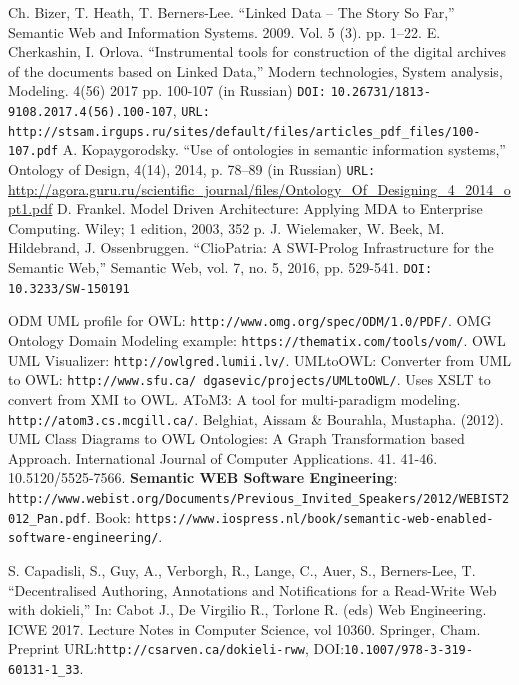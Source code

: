 \documentclass[conference,a4paper]{IEEEtran}
\providecommand\url[1]{\texttt{#1}}
\begin{document}
\begin{thebibliography}{11}

 Ch. Bizer, T. Heath, T. Berners-Lee. ``Linked Data – The Story So Far,'' Semantic Web and Information Systems. 2009. Vol. 5 (3). pp. 1–22.
 E. Cherkashin, I. Orlova. ``Instrumental tools for construction of the digital archives of the documents based on Linked Data,'' Modern technologies, System analysis, Modeling. 4(56) 2017 pp. 100-107 (in Russian) \texttt{DOI:} \url{10.26731/1813-9108.2017.4(56).100-107}, \texttt{URL:} \url{http://stsam.irgups.ru/sites/default/files/articles\_pdf\_files/100-107.pdf}
 A. Kopaygorodsky. ``Use of ontologies in semantic information systems,'' Ontology of Design, 4(14), 2014, p. 78--89 (in Russian) \texttt{URL:} \href{http://agora.guru.ru/scientific_journal/files/Ontology_Of_Designing_4_2014_opt1.pdf#page=79}{\ttfamily http://agora.guru.ru/scientific\_journal/files/On\-tology\_Of\_Designing\_4\_2014\_opt1.pdf}
 D. Frankel. Model Driven Architecture: Applying MDA to Enterprise Computing. Wiley; 1 edition, 2003, 352 p.
 J. Wielemaker, W. Beek, M. Hildebrand, J. Ossenbruggen. ``ClioPatria: A SWI-Prolog Infrastructure for the Semantic Web,'' Semantic Web, vol. 7, no. 5, 2016, pp. 529-541. \texttt{DOI:} \url{10.3233/SW-150191}

 ODM UML profile for OWL: \url{http://www.omg.org/spec/ODM/1.0/PDF/}.
 OMG Ontology Domain Modeling example: \url{https://thematix.com/tools/vom/}.
 OWL UML Visualizer: \url{http://owlgred.lumii.lv/}.
 UMLtoOWL: Converter from UML to OWL: \url{http://www.sfu.ca/~dgasevic/projects/UMLtoOWL/}. Uses XSLT to convert from XMI to OWL.
 AToM3: A tool for multi-paradigm modeling. \url{http://atom3.cs.mcgill.ca/}.
 Belghiat, Aissam \& Bourahla, Mustapha. (2012). UML Class Diagrams to OWL Ontologies: A Graph Transformation based Approach. International Journal of Computer Applications. 41. 41-46. 10.5120/5525-7566.
 \textbf{Semantic WEB Software Engineering}: \url{http://www.webist.org/Documents/Previous\_Invited\_Speakers/2012/WEBIST2012\_Pan.pdf}. Book: \url{https://www.iospress.nl/book/semantic-web-enabled-software-engineering/}.

  S.  Capadisli, S., Guy, A., Verborgh, R., Lange, C., Auer, S., Berners-Lee, T. ``Decentralised Authoring, Annotations and Notifications for a Read-Write Web with dokieli,'' In: Cabot J., De Virgilio R., Torlone R. (eds) Web Engineering. ICWE 2017. Lecture Notes in Computer Science, vol 10360. Springer, Cham. Preprint URL:\url{http://csarven.ca/dokieli-rww}, DOI:\url{10.1007/978-3-319-60131-1_33}.


\end{thebibliography}
\end{document}
